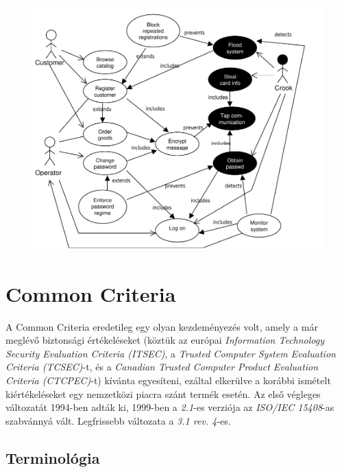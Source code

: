 \begin{figure}[h]
    \centering
    \includegraphics[width=\textwidth, height=0.5\textheight, keepaspectratio]{figures/misusecase.png}
\end{figure}

\FloatBarrier

\section{Common Criteria}

A Common Criteria eredetileg egy olyan kezdeményezés volt, amely a már meglévő biztonsági
értékeléseket (köztük az európai \emph{Information Technology Security Evaluation Criteria (ITSEC)},
a \emph{Trusted Computer System Evaluation Criteria (TCSEC)}-t, és a
\emph{Canadian Trusted Computer Product Evaluation Criteria (CTCPEC)}-t) kívánta egyesíteni, ezáltal
elkerülve a korábbi ismételt kiértékeléseket egy nemzetközi piacra szánt termék esetén.  Az első
végleges változatát 1994-ben adták ki, 1999-ben a \emph{2.1}-es verziója az \emph{ISO/IEC 15408}-as
szabvánnyá vált. Legfrissebb változata a \emph{3.1 rev. 4}-es.

\subsection{Terminológia}

